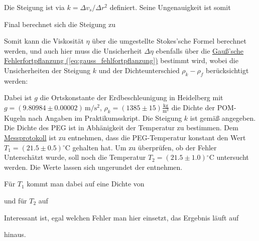 Die Steigung ist via $k = \Delta v_s / \Delta r^2$ definiert. Seine Ungenauigkeit ist somit


Final berechnet sich die Steigung zu

\label{eq:k}

Somit kann die Viskosität \(\eta\) über die umgestellte Stokes'sche Formel  berechnet werden, und auch hier muss die Unsicherheit \(\Delta \eta\) ebenfalls über die \hyperref[eq:gauss_fehlfortpflanzung]{Gauß'sche Fehlerfortpflanzung (\ref*{eq:gauss_fehlfortpflanzung})} bestimmt wird, wobei die Unsicherheiten der Steigung \(k\) und der Dichteunterschied \(\rho_k - \rho_f\) berücksichtigt werden:


Dabei ist $g$ die Ortskonstante der Erdbeschleunigung in Heidelberg mit $g = (9.80984 \pm 0.00002) \, \mathrm{m/s^2}$, $\rho_k = (1385 \pm 15) \mathrm{\frac{kg}{m^3}}$ die Dichte der POM-Kugeln nach Angaben im Praktikumsskript. Die Steigung $k$ ist gemäß  angegeben. Die Dichte des PEG ist in Abhänigkeit der Temperatur zu bestimmen. Dem \hyperref[ch:Protokoll]{Messprotokoll} ist zu entnehmen, dass die PEG-Temperatur konstant den Wert $T_1 = (21.5\pm 0.5) \mathrm{^\circ C}$ gehalten hat. Um zu überprüfen, ob der Fehler Unterschätzt wurde, soll noch die Temperatur $T_2 = (21.5\pm 1.0) \mathrm{^\circ C}$ untersucht werden. Die Werte lassen sich ungerundet der  entnehmen. 

Für $T_1$ kommt man dabei auf eine Dichte von


und für $T_2$ auf


Interessant ist, egal welchen Fehler man hier einsetzt, das Ergebnis läuft auf


hinaus. 


